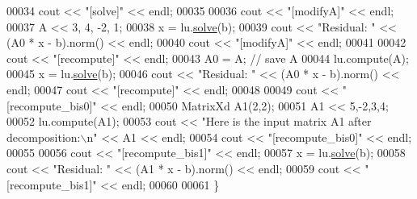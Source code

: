 \begin{DoxyCode}
00034 cout << \textcolor{stringliteral}{"[solve]"} << endl;
00035 
00036 cout << \textcolor{stringliteral}{"[modifyA]"} << endl;
00037   A << 3, 4, -2, 1;
00038   x = lu.\hyperlink{group___l_u___module_a49247bd2f742a46bca1f9c2bf1b19ad8}{solve}(b);
00039   cout << \textcolor{stringliteral}{"Residual: "} << (A0 * x - b).norm() << endl;
00040 cout << \textcolor{stringliteral}{"[modifyA]"} << endl;
00041 
00042 cout << \textcolor{stringliteral}{"[recompute]"} << endl;
00043   A0 = A; \textcolor{comment}{// save A}
00044   lu.compute(A);
00045   x = lu.\hyperlink{group___l_u___module_a49247bd2f742a46bca1f9c2bf1b19ad8}{solve}(b);
00046   cout << \textcolor{stringliteral}{"Residual: "} << (A0 * x - b).norm() << endl;
00047 cout << \textcolor{stringliteral}{"[recompute]"} << endl;
00048 
00049 cout << \textcolor{stringliteral}{"[recompute\_bis0]"} << endl;
00050   MatrixXd A1(2,2);
00051   A1 << 5,-2,3,4;
00052   lu.compute(A1);
00053   cout << \textcolor{stringliteral}{"Here is the input matrix A1 after decomposition:\(\backslash\)n"} << A1 << endl;
00054 cout << \textcolor{stringliteral}{"[recompute\_bis0]"} << endl;
00055 
00056 cout << \textcolor{stringliteral}{"[recompute\_bis1]"} << endl;
00057   x = lu.\hyperlink{group___l_u___module_a49247bd2f742a46bca1f9c2bf1b19ad8}{solve}(b);
00058   cout << \textcolor{stringliteral}{"Residual: "} << (A1 * x - b).norm() << endl;
00059 cout << \textcolor{stringliteral}{"[recompute\_bis1]"} << endl;
00060 
00061 \}
\end{DoxyCode}
